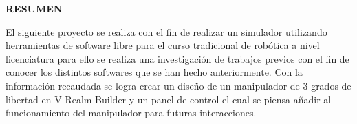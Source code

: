 \newpage

\begin{center}
{\bf \Large RESUMEN}
\end{center}

\vspace{1cm}

El siguiente proyecto se realiza con el fin de realizar un simulador utilizando herramientas de software libre para el curso tradicional de robótica a nivel licenciatura para ello se realiza una investigación de trabajos previos con el fin de conocer los distintos softwares que se han hecho anteriormente. Con la información recaudada se logra crear un diseño de un manipulador de 3 grados de libertad en V-Realm Builder y un panel de control el cual se piensa añadir al funcionamiento del manipulador para futuras interacciones.

